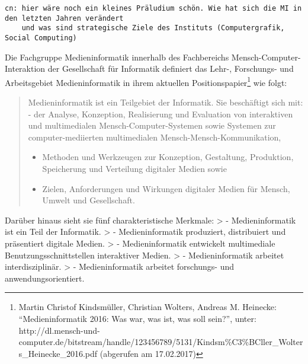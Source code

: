 \begin{verbatim}
cn: hier wäre noch ein kleines Präludium schön. Wie hat sich die MI in den letzten Jahren verändert
    und was sind strategische Ziele des Instituts (Computergrafik, Social Computing)
\end{verbatim}

Die Fachgruppe Medieninformatik innerhalb des Fachbereichs
Mensch-Computer-Interaktion der Gesellschaft für Informatik definiert
das Lehr-, Forschungs- und Arbeitsgebiet Medieninformatik in ihrem
aktuellen Positionspapier\footnote{Martin Christof Kindsmüller,
  Christian Wolters, Andreas M. Heinecke: ``Medieninformatik 2016: Was
  war, was ist, was soll sein?'', unter:
  http://dl.mensch-und-computer.de/bitstream/handle/123456789/5131/Kindsm\%C3\%BCller\_Wolters\_Heinecke\_2016.pdf
  (abgerufen am 17.02.2017)} wie folgt:

\begin{quote}
Medieninformatik ist ein Teilgebiet der Informatik. Sie beschäftigt sich
mit: - der Analyse, Konzeption, Realisierung und Evaluation von
interaktiven und multimedialen Mensch-Computer-Systemen sowie Systemen
zur computer-mediierten multimedialen Mensch-Mensch-Kommunikation,

\begin{itemize}
\tightlist
\item
  Methoden und Werkzeugen zur Konzeption, Gestaltung, Produktion,
  Speicherung und Verteilung digitaler Medien sowie
\item
  Zielen, Anforderungen und Wirkungen digitaler Medien für Mensch,
  Umwelt und Gesellschaft.
\end{itemize}
\end{quote}

Darüber hinaus sieht sie fünf charakteristische Merkmale: \textgreater{}
- Medieninformatik ist ein Teil der Informatik. \textgreater{} -
Medieninformatik produziert, distribuiert und präsentiert digitale
Medien. \textgreater{} - Medieninformatik entwickelt multimediale
Benutzungsschnittstellen interaktiver Medien. \textgreater{} -
Medieninformatik arbeitet interdisziplinär. \textgreater{} -
Medieninformatik arbeitet forschungs- und anwendungsorientiert.

